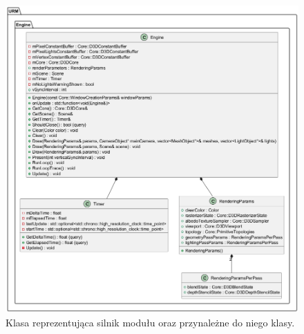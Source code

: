 	\begin{figure}[h!]
		\centering
		\includegraphics[width=\textwidth]{images/UML/engine.png}
		\caption{Klasa reprezentująca silnik modułu oraz przynależne do niego klasy.}
		\label{UML_Engine}
	\end{figure}